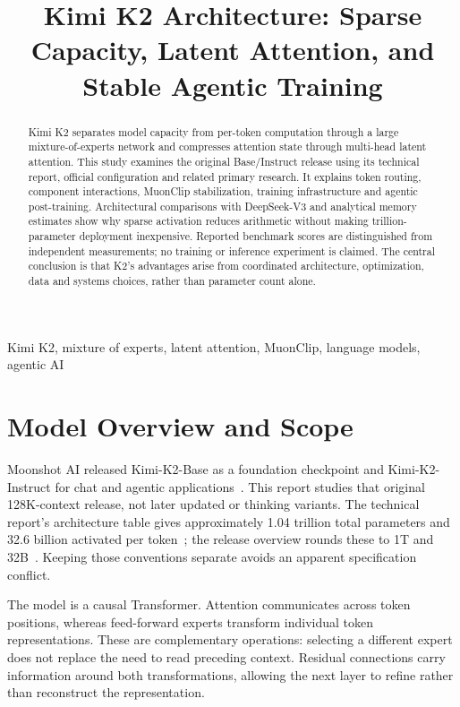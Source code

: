 \documentclass[conference]{IEEEtran}
\title{Kimi K2 Architecture: Sparse Capacity, Latent Attention, and Stable Agentic Training}
\author{\IEEEauthorblockN{Alaa Boghdady}\IEEEauthorblockA{Cellula AI Internship -- Week 8, Task 0}}
\begin{document}
\maketitle
\begin{abstract}
Kimi K2 separates model capacity from per-token computation through a large mixture-of-experts network and compresses attention state through multi-head latent attention. This study examines the original Base/Instruct release using its technical report, official configuration and related primary research. It explains token routing, component interactions, MuonClip stabilization, training infrastructure and agentic post-training. Architectural comparisons with DeepSeek-V3 and analytical memory estimates show why sparse activation reduces arithmetic without making trillion-parameter deployment inexpensive. Reported benchmark scores are distinguished from independent measurements; no training or inference experiment is claimed. The central conclusion is that K2's advantages arise from coordinated architecture, optimization, data and systems choices, rather than parameter count alone.
\end{abstract}
\begin{IEEEkeywords}
Kimi K2, mixture of experts, latent attention, MuonClip, language models, agentic AI
\end{IEEEkeywords}

\section{Model Overview and Scope}
Moonshot AI released Kimi-K2-Base as a foundation checkpoint and Kimi-K2-Instruct for chat and agentic applications~\cite{repo}. This report studies that original 128K-context release, not later updated or thinking variants. The technical report's architecture table gives approximately 1.04 trillion total parameters and 32.6 billion activated per token~\cite{k2}; the release overview rounds these to 1T and 32B~\cite{repo}. Keeping those conventions separate avoids an apparent specification conflict.

The model is a causal Transformer. Attention communicates across token positions, whereas feed-forward experts transform individual token representations. These are complementary operations: selecting a different expert does not replace the need to read preceding context. Residual connections carry information around both transformations, allowing the next layer to refine rather than reconstruct the representation.
\end{document}
